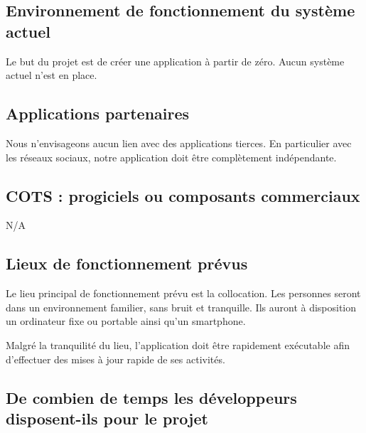 
\subsection{Environnement de fonctionnement du système actuel} %
\label{sub:environnement_de_fonctionnement_du_syst_me_actuel}

	Le but du projet est de créer une application à partir de zéro. Aucun système actuel n'est en place.


\subsection{Applications partenaires} %
\label{sub:applications_partenaires}

	Nous n'envisageons aucun lien avec des applications tierces. En particulier avec les réseaux sociaux, notre application doit être complètement indépendante.


\subsection{COTS : progiciels ou composants commerciaux} %
\label{sub:cots_progiciels_ou_composants_commerciaux}

	N/A


\subsection{Lieux de fonctionnement prévus} %
\label{sub:lieux_de_fonctionnement_pr_vus}

	Le lieu principal de fonctionnement prévu est la collocation. Les personnes seront dans un environnement familier, sans bruit et tranquille. Ils auront à disposition un ordinateur fixe ou portable ainsi qu'un smartphone.

	Malgré la tranquilité du lieu, l'application doit être rapidement exécutable afin d'effectuer des mises à jour rapide de ses activités.


\subsection{De combien de temps les développeurs disposent-ils pour le projet} %
\label{sub:de_combien_de_temps_les_d_veloppeurs_disposent_ils_pour_le_projet}

